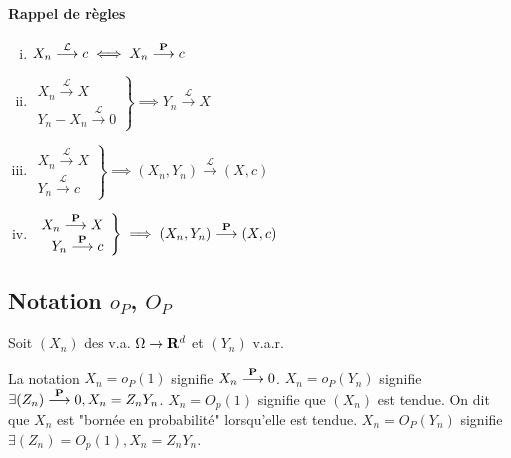\paragraph{Rappel de règles}

	\begin{pop}
		\begin{enumerate}[(i)]
			\item $X_n \overset{\mathcal{L}}{\longrightarrow} c \iff X_n \overset{\mathbf{P}}{\longrightarrow} c$
			\item $\left. \begin{array}{r}
				X_n \overset{\mathcal{L}}{\longrightarrow} X \\
				Y_n - X_n \overset{\mathcal{L}}{\longrightarrow} 0
				\end{array} \right\}
				\implies Y_n \overset{\mathcal{L}}{\longrightarrow} X$
			\item $\left. \begin{array}{r}
				X_n \overset{\mathcal{L}}{\longrightarrow} X \\
				Y_n \overset{\mathcal{L}}{\longrightarrow} c
				\end{array} \right\}
				\implies (X_n,Y_n) \overset{\mathcal{L}}{\longrightarrow} (X,c)$
			\item $\left. \begin{array}{r}
				X_n \overset{\mathbf{P}}{\longrightarrow} X \\
				Y_n \overset{\mathbf{P}}{\longrightarrow} c
				\end{array} \right\}
				\implies (X_n,Y_n) \overset{\mathbf{P}}{\longrightarrow} (X,c)$
		\end{enumerate}
	\end{pop}


\subsection{Notation $o_P$, $O_P$}

	Soit $(X_n)$ des v.a. $\Omega \to \mathbf{R}^d$ et $(Y_n)$ v.a.r.
	
	\begin{defn}
		La notation $X_n = o_P(1)$ signifie $X_n \overset{\mathbf{P}}{\longrightarrow} 0$.
		$X_n = o_P(Y_n)$ signifie $\exists (Z_n) \overset{\mathbf{P}}{\longrightarrow} 0, X_n = Z_n Y_n$.
		$X_n = O_p(1)$ signifie que $(X_n)$ est tendue.
		On dit que $X_n$ est "bornée en probabilité" lorsqu'elle est tendue.
		$X_n = O_P(Y_n)$ signifie $\exists (Z_n) = O_p(1), X_n = Z_n Y_n$.
	\end{defn}

